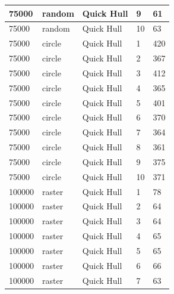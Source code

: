 \documentclass[12pt]{article}
\begin{document}
\begin{longtable}{|l|l|l|l|l|}
75000        & random            & Quick Hull & 9          & 61                            \\ \hline
75000        & random            & Quick Hull & 10         & 63                            \\ \hline
75000        & circle            & Quick Hull & 1          & 420                           \\ \hline
75000        & circle            & Quick Hull & 2          & 367                           \\ \hline
75000        & circle            & Quick Hull & 3          & 412                           \\ \hline
75000        & circle            & Quick Hull & 4          & 365                           \\ \hline
75000        & circle            & Quick Hull & 5          & 401                           \\ \hline
75000        & circle            & Quick Hull & 6          & 370                           \\ \hline
75000        & circle            & Quick Hull & 7          & 364                           \\ \hline
75000        & circle            & Quick Hull & 8          & 361                           \\ \hline
75000        & circle            & Quick Hull & 9          & 375                           \\ \hline
75000        & circle            & Quick Hull & 10         & 371                           \\ \hline
100000       & raster            & Quick Hull & 1          & 78                            \\ \hline
100000       & raster            & Quick Hull & 2          & 64                            \\ \hline
100000       & raster            & Quick Hull & 3          & 64                            \\ \hline
100000       & raster            & Quick Hull & 4          & 65                            \\ \hline
100000       & raster            & Quick Hull & 5          & 65                            \\ \hline
100000       & raster            & Quick Hull & 6          & 66                            \\ \hline
100000       & raster            & Quick Hull & 7          & 63                            \\ \hline

\end{longtable}
\end{document}
